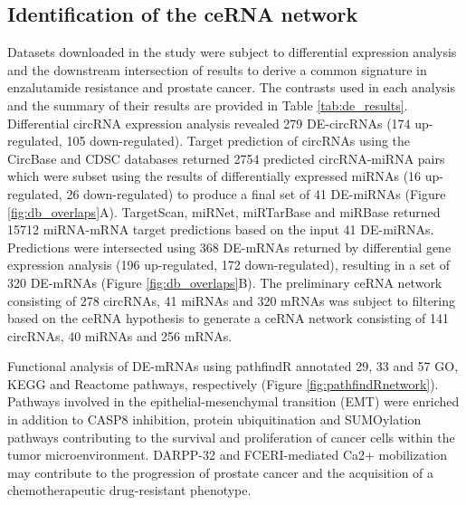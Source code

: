 \documentclass[twocolumn]{bmcart}%
\begin{document}
\subsection*{\textbf{Identification of the ceRNA network}}
Datasets downloaded in the study were subject to differential expression analysis and the downstream intersection of results to derive a common signature in enzalutamide resistance and prostate cancer. The contrasts used in each analysis and the summary of their results are provided in Table \ref{tab:de_results}. Differential circRNA expression analysis revealed 279 DE-circRNAs (174 up-regulated, 105 down-regulated). Target prediction of circRNAs using the CircBase and CDSC databases returned 2754 predicted circRNA-miRNA pairs which were subset using the results of differentially expressed miRNAs (16 up-regulated, 26 down-regulated) to produce a final set of 41 DE-miRNAs (Figure \ref{fig:db_overlaps}A). TargetScan, miRNet, miRTarBase and miRBase returned 15712 miRNA-mRNA target predictions based on the input 41 DE-miRNAs. Predictions were intersected using 368 DE-mRNAs returned by differential gene expression analysis (196 up-regulated, 172 down-regulated), resulting in a set of 320 DE-mRNAs (Figure \ref{fig:db_overlaps}B). The preliminary ceRNA network consisting of 278 circRNAs, 41 miRNAs and 320 mRNAs was subject to filtering based on the ceRNA hypothesis to generate a ceRNA network consisting of 141 circRNAs, 40 miRNAs and 256 mRNAs.
\par
Functional analysis of DE-mRNAs using pathfindR annotated 29, 33 and 57 GO, KEGG and Reactome pathways, respectively (Figure \ref{fig:pathfindRnetwork}). Pathways involved in the epithelial-mesenchymal transition (EMT) were enriched in addition to CASP8 inhibition, protein ubiquitination and SUMOylation pathways contributing to the survival and proliferation of cancer cells within the tumor microenvironment. DARPP-32 and FCERI-mediated Ca2+ mobilization may contribute to the progression of prostate cancer and the acquisition of a chemotherapeutic drug-resistant phenotype.
\end{document}
